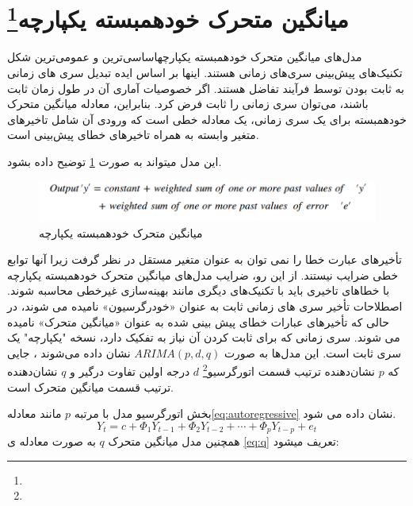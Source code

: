 \section{میانگین متحرک خودهمبسته یکپارچه\footnote{}}
مدل‌های میانگین متحرک خودهمبسته یکپارچه\footnotemark[1] اساسی‌ترین و عمومی‌ترین شکل تکنیک‌های پیش‌بینی سری‌های زمانی هستند. اینها بر اساس ایده تبدیل سری های زمانی به ثابت بودن توسط فرآیند تفاضل هستند. اگر خصوصیات آماری آن در طول زمان ثابت باشند، می‌توان سری زمانی را ثابت فرض کرد. بنابراین، معادله میانگین متحرک خودهمبسته  برای یک سری زمانی، یک معادله خطی است که ورودی آن شامل تاخیرهای متغیر وابسته به همراه تاخیرهای خطای پیش‌بینی است.

این مدل میتواند به صورت \ref{fig:ARIMA} توضیح داده بشود.

\begin{figure}[ht!]
    \begin{center}
        \includegraphics[width=12cm]{images/ARIMA.png}
    \end{center}
    \caption[میانگین متحرک خودهمبسته یکپارچه]{میانگین متحرک خودهمبسته یکپارچه}
    \label{fig:ARIMA}
    \end{figure}

    \noindent
    تأخیرهای عبارت خطا را نمی توان به عنوان متغیر مستقل در نظر گرفت زیرا آنها توابع خطی ضرایب نیستند. از این رو، ضرایب مدل‌های میانگین متحرک خودهمبسته یکپارچه 
    با خطاهای تاخیری باید با تکنیک‌های دیگری مانند بهینه‌سازی غیرخطی محاسبه شوند. اصطلاحات تأخیر سری های زمانی ثابت به عنوان «خودرگرسیون» نامیده می شوند، 
    در حالی که تأخیرهای عبارات خطای پیش بینی شده به عنوان «میانگین متحرک» نامیده می شوند. سری زمانی که برای ثابت کردن آن نیاز به تفکیک دارد،
     نسخه "یکپارچه" یک سری ثابت است.
     این مدل‌ها به صورت $ARIMA (p,d,q)$ نشان داده می‌شوند
    ، جایی که $p$ نشان‌دهنده ترتیب قسمت اتورگرسیو\footnote{} $d$ درجه اولین تفاوت درگیر و $q$ نشان‌دهنده ترتیب قسمت میانگین متحرک است.

    بخش اتورگرسیو مدل با مرتبه $p$ مانند معادله\ref*{eq:autoregressive} نشان داده می شود.
    \begin{equation}\label{eq:autoregressive}
        Y_t = c + \Phi_1 Y_{t-1} + \Phi_2 Y_{t-2} + \cdots + \Phi_p Y_{t-p} + e_t
    \end{equation}
    همچنین مدل میانگین متحرک $q$ به صورت معادله ی \ref{eq:q} تعریف میشود:
    
